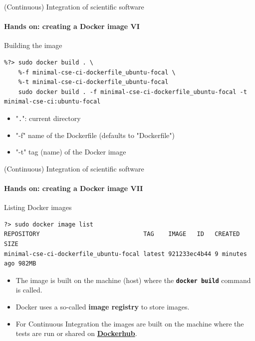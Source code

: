 \begin{frame}[fragile]{(Continuous) Integration of scientific software} 
    \framesubtitle{Hands on: creating a Docker image VI} 
    \vfill

    Building the image

\begin{verbatim}
%?> sudo docker build . \
    %-f minimal-cse-ci-dockerfile_ubuntu-focal \
    %-t minimal-cse-ci-dockerfile_ubuntu-focal
    sudo docker build . -f minimal-cse-ci-dockerfile_ubuntu-focal -t minimal-cse-ci:ubuntu-focal
\end{verbatim}

\begin{itemize}
    \item "\texttt{.}": current directory
    \item "-f" name of the Dockerfile (defaults to "Dockerfile")
    \item "-t" tag (name) of the Docker image
\end{itemize}

\end{frame}

\begin{frame}[fragile]{(Continuous) Integration of scientific software} 
    \framesubtitle{Hands on: creating a Docker image VII} 
    \vfill

    Listing Docker images

    \begin{verbatim}
?> sudo docker image list
REPOSITORY                             TAG    IMAGE   ID   CREATED        SIZE
minimal-cse-ci-dockerfile_ubuntu-focal latest 921233ec4b44 9 minutes ago 982MB
    \end{verbatim}

    \begin{itemize}
        \item The image is built on the machine (host) where the \textbf{\texttt{docker build}} command is called. 
        \item Docker uses a so-called \textbf{image registry} to store images.
        \item For Continuous Integration the images are built on the machine where the tests are run or shared on \href{https://hub.docker.com/}{\textbf{Dockerhub}}.
    \end{itemize}

\end{frame}

